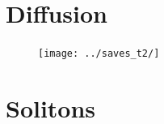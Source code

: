 \documentclass[
	a4paper, %
	10pt, %
]{CSUniSchoolLabReport}
\begin{document}
\section{Diffusion}

\begin{figure}
	\centering
	\texttt{[image: ../saves\_t2/]}
\end{figure}

\section{Solitons}








\end{document}
